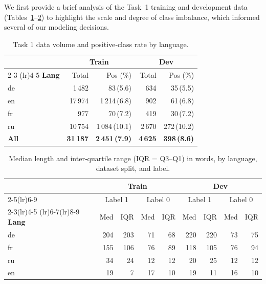 \documentclass[letterpaper]{article} %
\begin{document}
We first provide a brief analysis of the Task~1 training and development data (Tables~\ref{tab:data-volume-label}–\ref{tab:len-label0-1}) to highlight the scale and degree of class imbalance, which informed several of our modeling decisions.


\begin{table}[!htbp]
\centering
\small
\setlength{\tabcolsep}{4pt} %
\begin{tabular}{l rrrr}
\toprule %
& \multicolumn{2}{c}{\textbf{Train}} & \multicolumn{2}{c}{\textbf{Dev}} \\
\cmidrule(lr){2-3} \cmidrule(lr){4-5}
\textbf{Lang} & Total & Pos (\%) & Total & Pos (\%) \\
\midrule %
de & 1\,482  & 83\,(5.6)   & 634  & 35\,(5.5) \\
en & 17\,974 & 1\,214\,(6.8) & 902 & 61\,(6.8) \\
fr & 977    & 70\,(7.2)   & 419 & 30\,(7.2) \\
ru & 10\,754 & 1\,084\,(10.1) & 2\,670 & 272\,(10.2) \\
\midrule %
\textbf{All} & \textbf{31\,187} & \textbf{2\,451\,(7.9)} & \textbf{4\,625} & \textbf{398\,(8.6)} \\
\bottomrule %
\end{tabular}
\caption{Task 1 data volume and positive‑class rate by language.}
\label{tab:data-volume-label}
\end{table}

\begin{table}[!htbp]
\centering\small
\setlength{\tabcolsep}{4pt}
\begin{tabular}{lrrrrrrrr}
\toprule
& \multicolumn{4}{c}{\textbf{Train}} &
  \multicolumn{4}{c}{\textbf{Dev}}\\
\cmidrule(lr){2-5}\cmidrule(lr){6-9}
& \multicolumn{2}{c}{Label 1} &
  \multicolumn{2}{c}{Label 0} &
  \multicolumn{2}{c}{Label 1} &
  \multicolumn{2}{c}{Label 0}\\
\cmidrule(lr){2-3}\cmidrule(lr){4-5}
\cmidrule(lr){6-7}\cmidrule(lr){8-9}
\textbf{Lang} & Med & IQR & Med & IQR & Med & IQR & Med & IQR\\
\midrule
de & 204 & 203 & 71 & 68 & 220 & 220 & 73 & 75 \\
fr & 155 & 106 & 76 & 89 & 118 & 105 & 76 & 94 \\
ru &  34 &  24 & 12 & 12 &  20 &  25 & 12 & 12 \\
en &  19 &   7 & 17 & 10 &  19 &  11 & 16 & 10 \\
\bottomrule
\end{tabular}
\caption{Median length and inter‑quartile range (IQR = Q3–Q1) in words, by language, dataset split, and label.}
\label{tab:len-label0-1}
\end{table}
\end{document}
